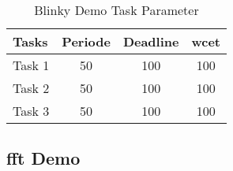 \documentclass[../EDF Master Thesis.tex]{subfiles}
\begin{document}
        \begin{table}[ht!]
            \centering
            \begin{tabular}{l|c|c|c}
                Tasks & Periode & Deadline & \ac{wcet} \\
                \hline
                Task 1 & 50 & 100 & 100\\
                Task 2 & 50 & 100 & 100\\
                Task 3 & 50 & 100 & 100\\
            \end{tabular}
            \caption{Blinky Demo Task Parameter}
            \label{table:blinky_demo_task_parameter}
        \end{table}

    
    \subsection{\ac{fft} Demo} \label{section:fft_demo}
\end{document}
